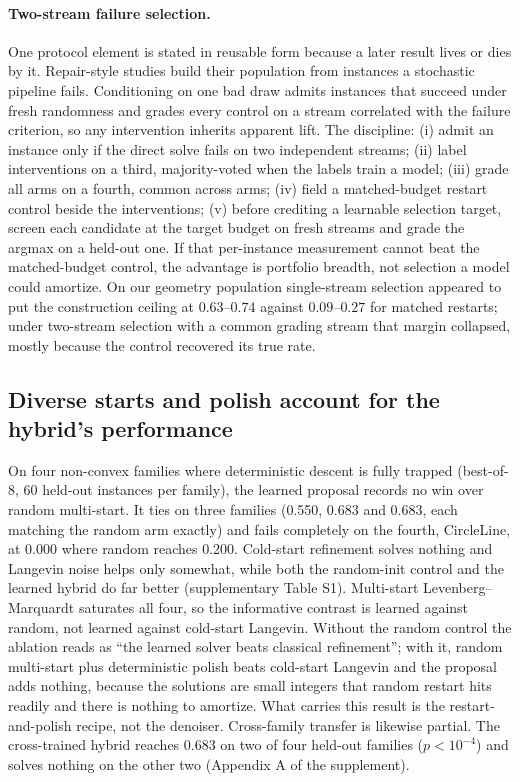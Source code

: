\documentclass[letterpaper]{article} %
\begin{document}
\paragraph{Two-stream failure selection.}
One protocol element is stated in reusable form because a later result lives or dies by it.
Repair-style studies build their population from instances a stochastic pipeline fails.
Conditioning on one bad draw admits instances that succeed under fresh randomness and grades
every control on a stream correlated with the failure criterion, so any intervention inherits
apparent lift. The discipline: (i) admit an
instance only if the direct solve fails on two independent streams; (ii) label interventions
on a third, majority-voted when the labels train a model; (iii) grade all arms on a fourth,
common across arms; (iv) field a matched-budget restart control beside the interventions;
(v) before crediting a learnable selection target, screen each candidate at the target budget
on fresh streams and grade the argmax on a held-out one. If that per-instance measurement
cannot beat the matched-budget control, the advantage is portfolio breadth, not selection a
model could amortize. On our geometry population single-stream selection appeared to put the construction ceiling at
$0.63$--$0.74$ against $0.09$--$0.27$ for matched restarts; under two-stream selection with a
common grading stream that margin collapsed, mostly because the control recovered its true
rate.

\subsection{Diverse starts and polish account for the hybrid's performance}
\label{sec:hybrid}

On four non-convex families where deterministic descent is fully trapped (best-of-8, 60
held-out instances per family), the learned proposal records no win over random multi-start.
It ties on three families (0.550, 0.683 and 0.683, each matching the random arm exactly) and
fails completely on the fourth, CircleLine, at 0.000 where random reaches 0.200.
Cold-start refinement solves nothing and Langevin noise helps only somewhat, while both the
random-init control and the learned hybrid do far better (supplementary Table S1).
Multi-start Levenberg--Marquardt saturates all four, so the informative contrast is learned
against random, not learned against cold-start Langevin.
Without the random control the ablation reads as ``the
learned solver beats classical refinement''; with it, random multi-start plus deterministic
polish beats cold-start Langevin and the proposal adds nothing, because the solutions are
small integers that random restart hits readily and there is nothing to
amortize. What carries this result is the restart-and-polish recipe, not the denoiser. Cross-family transfer is likewise
partial. The cross-trained hybrid reaches 0.683 on two of four held-out families
($p < 10^{-4}$) and solves nothing on the other two
(Appendix A of the supplement).
\end{document}
